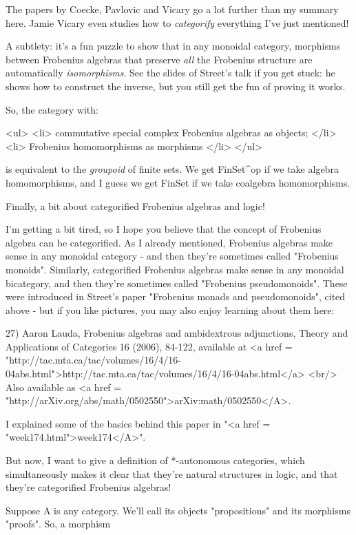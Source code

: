 The papers by Coecke, Pavlovic and Vicary go a lot further
than my summary here.  Jamie Vicary even studies how to 
\emph{categorify} everything I've just mentioned!

A subtlety: it's a fun puzzle to show that in any monoidal category,
morphisms between Frobenius algebras that preserve \emph{all} the
Frobenius structure are automatically \emph{isomorphisms}.  See the
slides of Street's talk if you get stuck: he shows how to construct
the inverse, but you still get the fun of proving it works.

So, the category with:

<ul>
<li>
 commutative special complex Frobenius algebras as objects;
</li>
<li>
 Frobenius homomorphisms as morphisms
</li>
</ul>

is equivalent to the \emph{groupoid} of finite sets.  We get
FinSet^{op} if we take algebra homomorphisms, and I guess we
get FinSet if we take coalgebra homomorphisms.

Finally, a bit about categorified Frobenius algebras and logic!

I'm getting a bit tired, so I hope you believe that the concept of
Frobenius algebra can be categorified.  As I already mentioned,
Frobenius algebras make sense in any monoidal category - and then
they're sometimes called "Frobenius monoids".  Similarly,
categorified Frobenius algebras make sense in any monoidal bicategory,
and then they're sometimes called "Frobenius pseudomonoids".
These were introduced in Street's paper "Frobenius monads and
pseudomonoids", cited above - but if you like pictures, you may
also enjoy learning about them here:

27) Aaron Lauda, Frobenius algebras and ambidextrous adjunctions,
Theory and Applications of Categories 16 (2006), 84-122, available at
<a href =
"http://tac.mta.ca/tac/volumes/16/4/16-04abs.html">http://tac.mta.ca/tac/volumes/16/4/16-04abs.html</a>
<br/> Also available as <a href =
"http://arXiv.org/abs/math/0502550">arXiv:math/0502550</A>.

I explained some of the basics behind this paper in "<a href =
"week174.html">week174</A>".

But now, I want to give a definition of *-autonomous categories,
which simultaneously makes it clear that they're natural structures
in logic, and that they're categorified Frobenius algebras!

Suppose A is any category.  We'll call its objects
"propositions" and its morphisms "proofs".
So, a morphism

